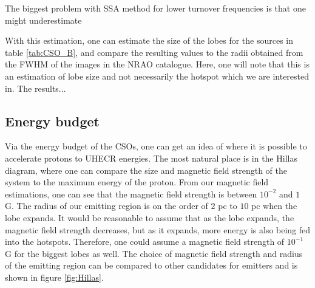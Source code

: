 The biggest problem with SSA method for lower turnover frequencies is that one might underestimate 





With this estimation, one can estimate the size of the lobes for the sources in table \ref{tab:CSO_B}, and compare the resulting values to the radii obtained from the FWHM of the images in the NRAO catalogue. Here, one will note that this is an estimation of lobe size and not necessarily the hotspot which we are interested in. The results...

\subsection{Energy budget}
Via the energy budget of the CSOs, one can get an idea of where it is possible to accelerate protons to UHECR energies. The most natural place is in the Hillas diagram, where one can compare the size and magnetic field strength of the system to the maximum energy of the proton. From our magnetic field estimations, one can see that the magnetic field strength is between $10^{-2}$ and $1$ G. The radius of our emitting region is on the order of $2$ pc to $10$ pc when the lobe expands. It would be reasonable to assume that as the lobe expands, the magnetic field strength decreases, but as it expands, more energy is also being fed into the hotspots. Therefore, one could assume a magnetic field strength of $10^{-1}$ G for the biggest lobes as well. The choice of magnetic field strength and radius of the emitting region can be compared to other candidates for emitters and is shown in figure \ref{fig:Hillas}.


